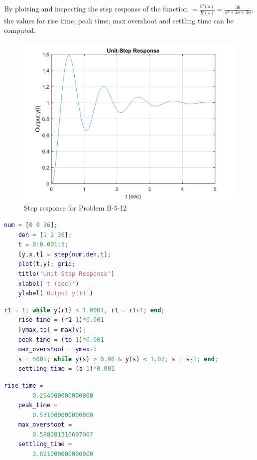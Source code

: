 \documentclass[12pt]{article}
\newenvironment{problem}[2][Problem]{\begin{trivlist}
		\item[\hskip \labelsep {\bfseries #1}\hskip \labelsep {\bfseries #2.}]}{\end{trivlist}}
\begin{document}
\begin{problem}{8 --- B-5-12 --- Matlab computations} \hfill\newline
	By plotting and inspecting the step response of the function $\displaystyle=\frac{C(s)}{R(s)}=\frac{36}{s^2+2s+36}$, the values for rise time, peak time, max overshoot and settling time can be computed.
	\begin{figure}[H]
		\centering
		\includegraphics[width=0.5\linewidth]{Images/Q8Step}
		\caption{Step response for Problem B-5-12}
		\label{fig:q8step}
	\end{figure}
\begin{lstlisting}[language = Matlab]
	num = [0 0 36];
	den = [1 2 36];
	t = 0:0.001:5;
	[y,x,t] = step(num,den,t);
	plot(t,y); grid;
	title('Unit-Step Response')
	xlabel('t (sec)')
	ylabel('Output y(t)')
\end{lstlisting}


\begin{lstlisting}[language = Matlab]
	r1 = 1; while y(r1) < 1.0001, r1 = r1+1; end;  
	rise_time = (r1-1)*0.001
	[ymax,tp] = max(y);
	peak_time = (tp-1)*0.001
	max_overshoot = ymax-1	
	s = 5001; while y(s) > 0.98 & y(s) < 1.02; s = s-1; end;
	settling_time = (s-1)*0.001
\end{lstlisting}
\begin{lstlisting}[language = Matlab]
	rise_time =
		0.294000000000000
	peak_time =
		0.531000000000000
	max_overshoot =
		0.588001316697907
	settling_time =
		3.821000000000000
\end{lstlisting}
\end{problem}
\end{document}
